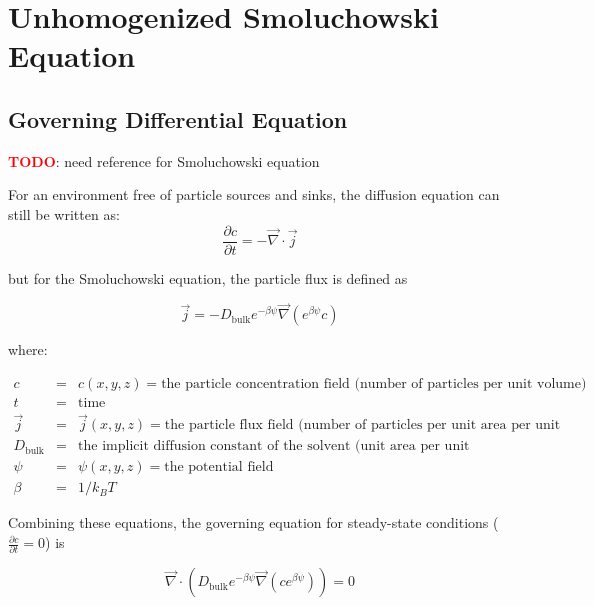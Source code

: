 
\section{Unhomogenized Smoluchowski Equation}\label{sec:unhom_smol}

\subsection{Governing Differential Equation}\label{subsec:unhom_smol_gov}

\textcolor{red}{\textbf{TODO}}: need reference for Smoluchowski equation

For an environment free of particle sources and sinks,
the diffusion equation can still be written as:
\begin{equation}
\frac{\partial c}{\partial t} = - \vec{\nabla} \cdot \vec{j}
\end{equation}

but for the Smoluchowski equation, the particle flux is defined as

\begin{equation}
\vec{j} = - D_{\mathrm{bulk}} e^{-\beta \psi} \vec{\nabla} \left( e^{\beta \psi} c \right)
\end{equation}

where:

$\begin{array}{rcl}
c & = & c(x,y,z) = \text{the particle concentration field (number of particles per unit volume)} \\
t & = & \text{time} \\
\vec{j} & = & \vec{j}(x,y,z) = \text{the particle flux field (number of particles per unit area per unit time)} \\
D_{\mathrm{bulk}} & = & \text{the implicit diffusion constant of the solvent (unit area per unit time)} \\
\psi & = & \psi(x,y,z) = \text{the potential field} \\
\beta & = & 1/k_B T
\end{array}$

Combining these equations, the governing equation for steady-state conditions ($\frac{\partial c}{\partial t} = 0$) is

\begin{equation}
\vec{\nabla} \cdot \left( D_{\mathrm{bulk}} e^{-\beta \psi} \vec{\nabla} \left( c e^{\beta \psi} \right) \right) = 0
\end{equation}

